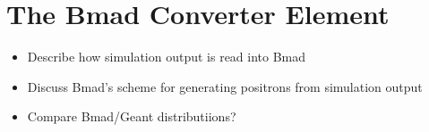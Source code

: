 \documentclass[letter,
               biblatex,     %
               keeplastbox,   %
               ]{jacow}
\begin{document}

%
%


%
%


\section{The Bmad Converter Element}

\begin{itemize}
\item
Describe how simulation output is read into Bmad

\item
Discuss Bmad's scheme for generating positrons from simulation output

\item
Compare Bmad/Geant distributiions?

\end{itemize}
\end{document}
